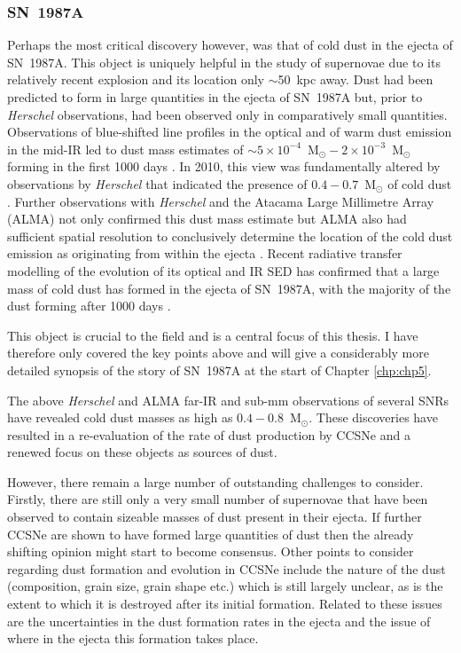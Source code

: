  \subsubsection{SN~1987A}
 
 Perhaps the most critical discovery however, was that of cold dust in the ejecta of SN~1987A.  This object is uniquely helpful in the study of supernovae due to its relatively recent explosion and its location only $\sim$50~kpc away.  Dust had been predicted to form in large quantities in the ejecta of SN~1987A \citep{Dwek1988} but, prior to {\em Herschel} observations, had been observed only in comparatively small quantities.  Observations of blue-shifted line profiles in the optical and of warm dust emission in the mid-IR led to dust mass estimates of $\sim5\times 10^{-4}$~M$_{\odot} - 2 \times 10^{-3}$~M$_{\odot}$ forming in the first 1000 days \citep{Lucy1989,Roche1989,Bouchet1991,Wooden1993,Ercolano2007}.  In 2010, this view was fundamentally altered by observations by \textit{Herschel} that indicated the presence of $0.4-0.7$~M$_{\odot}$ of cold dust \citep{Matsuura2011}.  Further observations with {\em Herschel} and the Atacama Large Millimetre Array (ALMA) not only confirmed this dust mass estimate but ALMA also had sufficient spatial resolution to conclusively determine the location of the cold dust emission as originating from within the ejecta \citep{Indebetouw2014,Matsuura2015}.  Recent radiative transfer modelling of the evolution of its optical and IR SED has confirmed that a large  mass of cold dust has formed in the ejecta of SN~1987A, with the majority of the dust forming after 1000 days \citep{Wesson2015}.
 
 This object is crucial to the field and is a central focus of this thesis.  I have therefore only covered the key points above and will give a considerably more detailed synopsis of the story of SN~1987A at the start of Chapter \ref{chp:chp5}.
 
\vspace{3ex}
\noindent The above {\em Herschel} and ALMA far-IR and sub-mm observations of several SNRs have revealed cold dust masses as high as $0.4-0.8$~M$_{\odot}$.  These discoveries have resulted in a re-evaluation of the rate of dust production by CCSNe and a renewed focus on these objects as sources of dust.

However, there remain a large number of outstanding challenges to consider.  Firstly, there are still only a very small number of supernovae that have been observed to contain sizeable masses of dust present in their ejecta.  If further CCSNe are shown to have formed large quantities of dust then the already shifting opinion might start to become consensus.  Other points to consider regarding dust formation and evolution in CCSNe include the nature of the dust (composition, grain size, grain shape etc.) which is still largely unclear, as is the extent to which it is destroyed after its initial formation.  Related to these issues are the uncertainties in the dust formation rates in the ejecta and the issue of where in the ejecta this formation takes place.  

